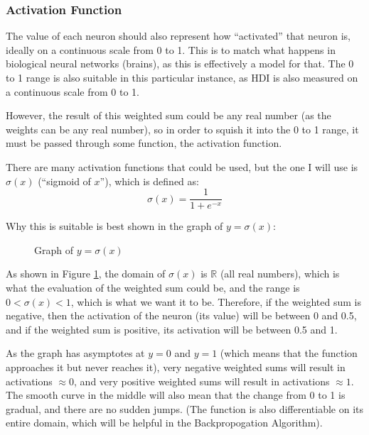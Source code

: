 \documentclass[12pt]{report}
\begin{document}
\subsubsection{Activation Function}
The value of each neuron should also represent how ``activated'' that neuron is, ideally on a continuous scale from 0 to 1. This is to match what happens in biological neural networks (brains), as this is effectively a model for that. The 0 to 1 range is also suitable in this particular instance, as HDI is also measured on a continuous scale from 0 to 1.

However, the result of this weighted sum could be any real number (as the weights can be any real number), so in order to squish it into the 0 to 1 range, it must be passed through some function, the activation function.

There are many activation functions that could be used, but the one I will use is $\sigma \left(x\right)$ (``sigmoid of $x$''), which is defined as:
\begin{equation}
    \sigma \left(x\right)=\frac{1}{1+e^{-x}}
\end{equation}

Why this is suitable is best shown in the graph of $y=\sigma \left(x\right)$:
\begin{figure}[H]
\centering
{}
\caption{Graph of $y=\sigma \left(x\right)$}\label{fig:sigmoidX}
\end{figure}

As shown in Figure \ref{fig:sigmoidX}, the domain of $\sigma \left(x\right)$ is $\mathbb{R}$ (all real numbers), which is what the evaluation of the weighted sum could be, and the range is $0<\sigma \left(x\right)<1$, which is what we want it to be. Therefore, if the weighted sum is negative, then the activation of the neuron (its value) will be between 0 and 0.5, and if the weighted sum is positive, its activation will be between 0.5 and 1.

As the graph has asymptotes at $y=0$ and $y=1$ (which means that the function approaches it but never reaches it), very negative weighted sums will result in activations $\approx 0$, and very positive weighted sums will result in activations $\approx 1$. The smooth curve in the middle will also mean that the change from 0 to 1 is gradual, and there are no sudden jumps. (The function is also differentiable on its entire domain, which will be helpful in the Backpropogation Algorithm).
\end{document}
